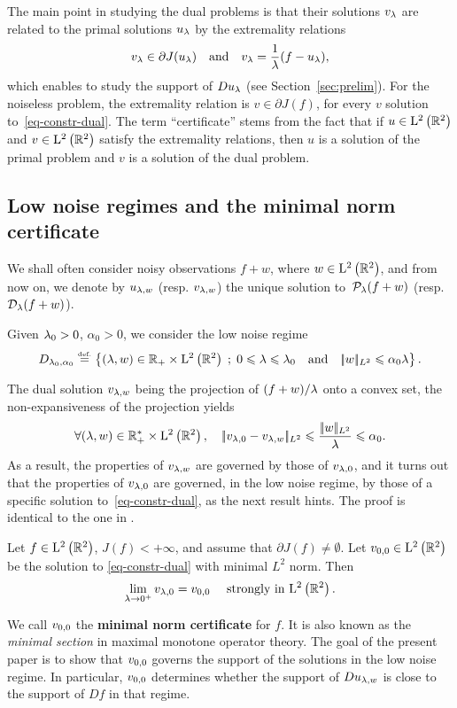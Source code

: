 The main point in studying the dual problems is that their solutions $v_\lambda$ are related to the primal solutions $u_\lambda$ by the extremality relations
\begin{align*}
  v_\lambda \in \partial J(u_\lambda) \quad \text{and} \quad 
  v_\lambda = \frac{1}{\lambda}(f-u_\lambda),
\end{align*}
which enables to study the support of $Du_\lambda$ (see Section~\ref{sec:prelim}).
For the noiseless problem, the extremality relation is $v\in \partial J(f)$, for every $v$ solution to~\eqref{eq-constr-dual}.
The term ``certificate'' stems from the fact that if $u\in\mathrm{L}^2\left(\mathbb{R}^2\right)$ and $v\in\mathrm{L}^2\left(\mathbb{R}^2\right)$ satisfy the extremality relations, then $u$ is a solution of the primal problem and $v$ is a solution of the dual problem. 


\subsection{Low noise regimes and the minimal norm certificate}
We shall often consider noisy observations $f+w$, where $w\in \mathrm{L}^2\left(\mathbb{R}^2\right)$, and from now on, we denote by $u_{\lambda,w}$ (resp. $v_{\lambda,w}$) the unique solution to~$\mathcal{P}_\lambda(f+w)$ (resp.~$\mathcal{D}_\lambda(f+w)$).

Given $\lambda_0>0$, $\alpha_0>0$, we consider the low noise regime
\begin{equation}\label{eq:intro-lnr}
  D_{\lambda_0,\alpha_0}\stackrel{\mbox{\upshape\tiny def.}}{=} \left\{ (\lambda,w)\in \mathbb{R}_+\times \mathrm{L}^2\left(\mathbb{R}^2\right) \;;\; 0\leqslant\lambda \leqslant \lambda_0\quad \text{and} \quad|\!| w |\!|_{L^2}\leqslant \alpha_0 \lambda  \right\}.
\end{equation}

The dual solution $v_{\lambda,w}$ being the projection of $(f+w)/\lambda$ onto a convex set, the non-expansiveness of the projection yields
\begin{equation*}
  \forall (\lambda,w)\in \mathbb{R}^*_+\times\mathrm{L}^2\left(\mathbb{R}^2\right), \quad |\!| v_{\lambda,0}-v_{\lambda,w} |\!|_{L^2}\leqslant \frac{|\!| w |\!|_{L^2}}{\lambda}\leqslant \alpha_0. 
\end{equation*}
As a result, the properties of $v_{\lambda,w}$ are governed by those of $v_{\lambda,0}$, and it turns out that the properties of $v_{\lambda,0}$ are governed, in the low noise regime, by those of a specific solution to~\eqref{eq-constr-dual}, as the next result hints. The proof is identical to the one in \cite{duvalpeyre13}.
\begin{prop}
  Let $f\in \mathrm{L}^2\left(\mathbb{R}^2\right)$, $J(f)<+\infty$, and assume that $\partial J(f)\neq \emptyset$. Let $v_{0,0}\in \mathrm{L}^2\left(\mathbb{R}^2\right)$ be the solution to \eqref{eq-constr-dual} with minimal $L^2$ norm. Then
   \begin{align*}
    \lim_{\lambda\to 0^+} v_{\lambda,0} = v_{0,0} \quad \mbox{ strongly in } \mathrm{L}^2\left(\mathbb{R}^2\right).
  \end{align*}
\end{prop}
We call $v_{0,0}$ the \textbf{minimal norm certificate} for $f$. It is also known as the \textit{minimal section} in maximal monotone operator theory. The goal of the present paper is to show that $v_{0,0}$ governs the support of the solutions in the low noise regime. In particular, $v_{0,0}$ determines whether the support of $Du_{\lambda,w}$ is close to the support of $Df$ in that regime.

